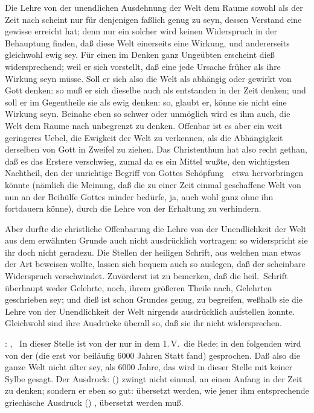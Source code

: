 \begin{aufza}
\item Die Lehre von der unendlichen Ausdehnung der Welt dem Raume sowohl als der Zeit nach scheint nur für denjenigen faßlich genug zu seyn, dessen Verstand eine gewisse  erreicht hat; denn nur ein solcher wird keinen Widerspruch in der Behauptung finden, daß diese Welt einerseits eine Wirkung, und andererseits gleichwohl ewig sey. Für einen im Denken ganz Ungeübten erscheint dieß widersprechend; weil er sich vorstellt, daß eine jede Ursache früher als ihre Wirkung seyn müsse. Soll er sich also die Welt als abhängig oder gewirkt von Gott denken: so muß er sich dieselbe auch als entstanden in der Zeit denken; und soll er im Gegentheile sie als ewig denken: so, glaubt er, könne sie nicht eine Wirkung seyn. Beinahe eben so schwer oder unmöglich wird es ihm auch, die Welt dem Raume nach unbegrenzt zu denken. Offenbar ist es aber ein weit geringeres Uebel, die Ewigkeit der Welt zu verkennen, als die Abhängigkeit derselben von Gott in Zweifel zu ziehen. Das Christenthum hat also recht gethan, daß es das Erstere verschwieg, zumal da es ein Mittel wußte, den wichtigsten Nachtheil, den der unrichtige Begriff von Gottes Schöpfung~\ etwa hervorbringen könnte (nämlich die Meinung, daß die zu einer Zeit einmal geschaffene Welt von nun an der Beihülfe Gottes minder bedürfe, ja, auch wohl ganz ohne ihn fortdauern könne), durch die Lehre von der Erhaltung zu verhindern.
\item Aber durfte die christliche Offenbarung die Lehre von der Unendlichkeit der Welt aus dem erwähnten Grunde auch nicht ausdrücklich vortragen: so widerspricht sie ihr doch nicht geradezu. Die Stellen der heiligen Schrift, aus welchen man etwas der Art beweisen wollte, lassen sich bequem auch so auslegen, daß der scheinbare Widerspruch verschwindet. Zuvörderst ist zu bemerken, daß die heil.\ Schrift überhaupt weder  Gelehrte, noch, ihrem größeren Theile nach,  Gelehrten geschrieben sey; und dieß ist schon Grundes genug, zu begreifen, weßhalb sie die Lehre von der Unendlichkeit der Welt nirgends ausdrücklich aufstellen konnte. Gleichwohl sind ihre Ausdrücke überall so, daß sie ihr nicht widersprechen.
\begin{aufzb}
\item {}: , \usw\ In dieser Stelle ist von der  nur in dem 1.\,V.\ die Rede; in den folgenden wird von der  (die erst vor beiläufig 6000 Jahren Statt fand) gesprochen. Daß also die ganze Welt nicht älter sey, als 6000 Jahre, das wird in dieser Stelle mit keiner Sylbe gesagt. Der Ausdruck:   () zwingt nicht einmal, an einen Anfang in der Zeit zu denken; sondern er  eben so gut:  übersetzt werden, wie jener ihm entsprechende griechische Ausdruck () ,  übersetzt werden muß.

\end{aufzb}
\end{aufza}
